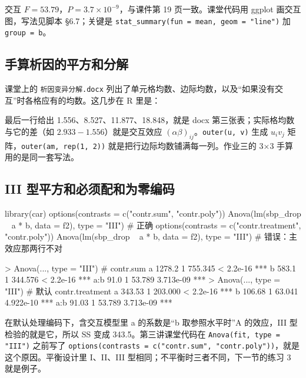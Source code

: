 交互 $F=53.79$，$P=3.7\times10^{-9}$，与课件第 19 页一致。课堂代码用 ggplot 画交互图，写法见脚本 §6.7；关键是 \Verb|stat_summary(fun = mean, geom = "line")| 加 \Verb|group = b|。

\subsection{手算析因的平方和分解}
课堂上的 \Verb|析因变异分解.docx| 列出了单元格均数、边际均数，以及“如果没有交互”时各格应有的均数。这几步在 R 里是：

最后一行给出 1.556、8.527、11.877、18.848，就是 docx 第三张表；实际格均数与它的差（如 $2.933-1.556$）就是交互效应 $(\alpha\beta)_{ij}$。\Verb|outer(u, v)| 生成 $u_iv_j$ 矩阵，\Verb|outer(am, rep(1, 2))| 就是把行边际均数铺满每一列。作业三的 3×3 手算用的是同一套写法。

\subsection{III 型平方和必须配和为零编码}
\label{sec:type3}
\begin{RCode}[R · Anova(type = "III") 的正确与错误写法]
library(car)
options(contrasts = c("contr.sum", "contr.poly"))
Anova(lm(sbp_drop ~ a * b, data = f2), type = "III")   # 正确
options(contrasts = c("contr.treatment", "contr.poly"))
Anova(lm(sbp_drop ~ a * b, data = f2), type = "III")   # 错误：主效应那两行不对
\end{RCode}
\begin{ROut}
> Anova(..., type = "III")      # contr.sum
a           1278.2  1  755.345 < 2.2e-16 ***
b            583.1  1  344.576 < 2.2e-16 ***
a:b           91.0  1   53.789 3.713e-09 ***
> Anova(..., type = "III")      # 默认 contr.treatment
a           343.53  1 203.000 < 2.2e-16 ***
b           106.68  1  63.041 4.922e-10 ***
a:b          91.03  1  53.789 3.713e-09 ***
\end{ROut}
在默认处理编码下，含交互模型里 a 的系数是“b 取参照水平时”A 的效应，III 型检验的就是它，所以 SS 变成 343.5。第三讲课堂代码在 \Verb|Anova(fit, type = "III")| 之前写了 \Verb|options(contrasts = c("contr.sum", "contr.poly"))|，就是这个原因。平衡设计里 I、II、III 型相同；不平衡时三者不同，下一节的练习 3 就是例子。

